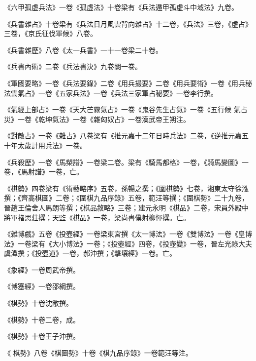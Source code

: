 \begin{pinyinscope}
 《六甲孤虛兵法》一卷《孤虛法》十卷梁有《兵法遁甲孤虛斗中域法》九卷。



 《兵書雜占》十卷梁有《兵法日月風雲背向雜占》十二卷，《兵法》三卷，《虛占》三卷，《京氏征伐軍候》八卷。



 《兵書雜歷》八卷《太一兵書》一十一卷梁二十卷。



 《兵書內術》二卷《兵法書決》九卷闕一卷。



 《軍國要略》一卷《兵法要錄》二卷《用兵撮要》二卷《用兵要術》一卷《用兵秘法雲氣占》一卷《五家兵法》一卷《兵法三家軍占秘要》一卷李行撰。



 《氣經上部占》一卷《天大芒霧氣占》一卷《鬼谷先生占氣》一卷《五行候
 氣占災》一卷《乾坤氣法》一卷《雜匈奴占》一卷漢武帝王朔注。



 《對敵占》一卷《雜占》八卷梁有《推元嘉十二年日時兵法》二卷，《逆推元嘉五十年太歲計用兵法》一卷。



 《兵殺歷》一卷《馬槊譜》一卷梁二卷。梁有《騎馬都格》一卷，《騎馬變圖》一卷，《馬射譜》一卷，亡。



 《棋勢》四卷梁有《術藝略序》五卷，孫暢之撰；《圍棋勢》七卷，湘東太守徐泓撰；《齊高棋圖》二卷；《圍棋九品序錄》五卷，範汪等撰；《圍棋勢》二十九卷，晉趙王倫舍人馬朗等撰；《棋品敘略》三卷；建元永明《棋品》二卷，宋員外殿中將軍褚思莊撰；天監《棋品》一卷，梁尚書僕射柳惲撰。亡。



 《雜博戲》五卷《投壺經》一卷梁東宮撰《太一博法》一卷《雙博法》一卷《皇博法》一卷梁有《大小博法》一卷；《投壺經》四卷，《投壺變》一卷，晉左光祿大夫虞潭撰；《投壺道》一卷，郝沖撰；《擊壤經》一卷。亡。



 《象經》一卷周武帝撰。



 《博塞經》一卷邵綱撰。



 《棋勢》十卷沈敞撰。



 《棋勢》十卷二卷，成。



 《棋勢》十卷王子沖撰。



 《
 棋勢》八卷《棋圖勢》十卷《棋九品序錄》一卷範汪等注。




\end{pinyinscope}
